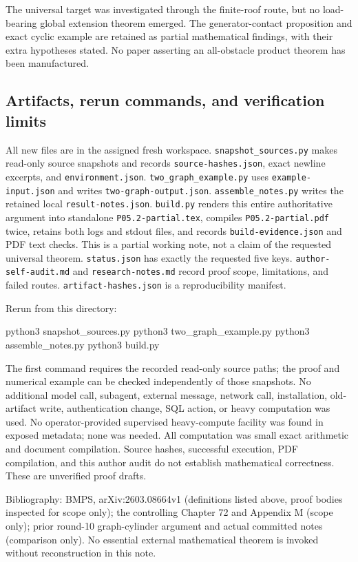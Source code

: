 \documentclass[
  10pt,
]{article}
\newenvironment{Shaded}{}{}
\newcommand{\ExtensionTok}[1]{#1}
\newcommand{\NormalTok}[1]{#1}
\begin{document}
The universal target was investigated through the finite-roof route, but
no load-bearing global extension theorem emerged. The generator-contact
proposition and exact cyclic example are retained as partial
mathematical findings, with their extra hypotheses stated. No paper
asserting an all-obstacle product theorem has been manufactured.

\subsection{Artifacts, rerun commands, and verification
limits}\label{artifacts-rerun-commands-and-verification-limits}

All new files are in the assigned fresh workspace.
\texttt{snapshot\_sources.py} makes read-only source snapshots and
records \texttt{source-hashes.json}, exact newline excerpts, and
\texttt{environment.json}. \texttt{two\_graph\_example.py} uses
\texttt{example-input.json} and writes \texttt{two-graph-output.json}.
\texttt{assemble\_notes.py} writes the retained local
\texttt{result-notes.json}. \texttt{build.py} renders this entire
authoritative argument into standalone \texttt{P05.2-partial.tex},
compiles \texttt{P05.2-partial.pdf} twice, retains both logs and stdout
files, and records \texttt{build-evidence.json} and PDF text checks.
This is a partial working note, not a claim of the requested universal
theorem. \texttt{status.json} has exactly the requested five keys.
\texttt{author-self-audit.md} and \texttt{research-notes.md} record
proof scope, limitations, and failed routes.
\texttt{artifact-hashes.json} is a reproducibility manifest.

Rerun from this directory:

\begin{Shaded}
\begin{Highlighting}[]
\ExtensionTok{python3}\NormalTok{ snapshot\_sources.py}
\ExtensionTok{python3}\NormalTok{ two\_graph\_example.py}
\ExtensionTok{python3}\NormalTok{ assemble\_notes.py}
\ExtensionTok{python3}\NormalTok{ build.py}
\end{Highlighting}
\end{Shaded}

The first command requires the recorded read-only source paths; the
proof and numerical example can be checked independently of those
snapshots. No additional model call, subagent, external message, network
call, installation, old-artifact write, authentication change, SQL
action, or heavy computation was used. No operator-provided supervised
heavy-compute facility was found in exposed metadata; none was needed.
All computation was small exact arithmetic and document compilation.
Source hashes, successful execution, PDF compilation, and this author
audit do not establish mathematical correctness. These are unverified
proof drafts.

Bibliography: BMPS, arXiv:2603.08664v1 (definitions listed above, proof
bodies inspected for scope only); the controlling Chapter 72 and
Appendix M (scope only); prior round-10 graph-cylinder argument and
actual committed notes (comparison only). No essential external
mathematical theorem is invoked without reconstruction in this note.
\end{document}
